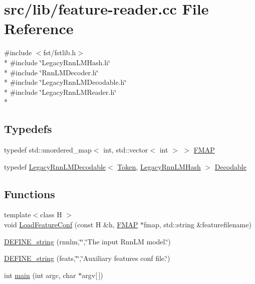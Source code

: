 \hypertarget{feature-reader_8cc}{}\section{src/lib/feature-\/reader.cc File Reference}
\label{feature-reader_8cc}
{\ttfamily \#include $<$fst/fstlib.\+h$>$}\\*
{\ttfamily \#include \char`\"{}Legacy\+Rnn\+L\+M\+Hash.\+h\char`\"{}}\\*
{\ttfamily \#include \char`\"{}Rnn\+L\+M\+Decoder.\+h\char`\"{}}\\*
{\ttfamily \#include \char`\"{}Legacy\+Rnn\+L\+M\+Decodable.\+h\char`\"{}}\\*
{\ttfamily \#include \char`\"{}Legacy\+Rnn\+L\+M\+Reader.\+h\char`\"{}}\\*
\subsection*{Typedefs}
\begin{DoxyCompactItemize}
\item 
typedef std\+::unordered\+\_\+map$<$ int, std\+::vector$<$ int $>$ $>$ \hyperlink{feature-reader_8cc_a6f19009d35f2ced0560470ee58648357}{F\+M\+AP}
\item 
typedef \hyperlink{class_legacy_rnn_l_m_decodable}{Legacy\+Rnn\+L\+M\+Decodable}$<$ \hyperlink{class_token}{Token}, \hyperlink{class_legacy_rnn_l_m_hash}{Legacy\+Rnn\+L\+M\+Hash} $>$ \hyperlink{feature-reader_8cc_a43ce4eb8f370c5b37f80c5bb5f1b4e16}{Decodable}
\end{DoxyCompactItemize}
\subsection*{Functions}
\begin{DoxyCompactItemize}
\item 
{\footnotesize template$<$class H $>$ }\\void \hyperlink{feature-reader_8cc_aa40d7f819c8f8e25c477ff0277a3c488}{Load\+Feature\+Conf} (const H \&h, \hyperlink{feature-reader_8cc_a6f19009d35f2ced0560470ee58648357}{F\+M\+AP} $\ast$fmap, std\+::string \&featurefilename)
\item 
\hyperlink{feature-reader_8cc_a4d6c8868221908bdaac95aeb694bf7d2}{D\+E\+F\+I\+N\+E\+\_\+string} (rnnlm,\char`\"{}\char`\"{},\char`\"{}The input Rnn\+LM model.\char`\"{})
\item 
\hyperlink{feature-reader_8cc_a4aec534fd49e2d20e5094494d76cd830}{D\+E\+F\+I\+N\+E\+\_\+string} (feats,\char`\"{}\char`\"{},\char`\"{}Auxiliary features conf file.\char`\"{})
\item 
int \hyperlink{feature-reader_8cc_a0ddf1224851353fc92bfbff6f499fa97}{main} (int argc, char $\ast$argv\mbox{[}$\,$\mbox{]})
\end{DoxyCompactItemize}


